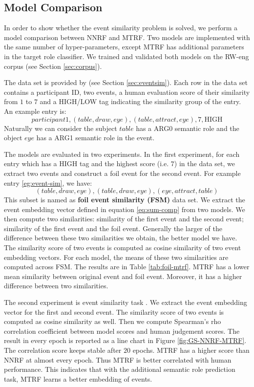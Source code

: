 \documentclass[a4paper]{article}
\begin{document}
\subsection{Model Comparison} \label{sec:comp_mtrf}
In order to show whether the event similarity problem is solved, we perform a model comparison between NNRF and MTRF. Two models are implemented with the same number of hyper-parameters, except MTRF has additional parameters in the target role classifier. We trained and validated both models on the RW-eng corpus (see Section \ref{sec:corpus}). 

The data set is provided by \citet{grefenstette2015concrete} (see Section \ref{sec:eventsim}). Each row in the data set contains a participant ID, two events, a human evaluation score of their similarity from $1$ to $7$ and a HIGH/LOW tag indicating the similarity group of the entry. An example entry is:
\begin{equation} \label{eg:event-sim}
    participant1, (table, draw, eye), (table, attract, eye), 7, \text{HIGH}
\end{equation}
Naturally we can consider the subject $table$ has a ARG0 semantic role and the object $eye$ has a ARG1 semantic role in the event.

The models are evaluated in two experiments. In the first experiment, for each entry which has a HIGH tag and the highest score (i.e. $7$) in the data set, we extract two events and construct a foil event for the second event. For example entry \eqref{eg:event-sim}, we have:
\begin{equation}
    (table, draw, eye), (table, draw, eye), (eye, attract, table)
\end{equation}
This subset is named as \textbf{foil event similarity (FSM)} data set. We extract the event embedding vector defined in equation  \eqref{eq:sum-comp} from two models. We then compute two similarities: similarity of the first event and the second event; similarity of the first event and the foil event. Generally the larger of the difference between these two similarities we obtain, the better model we have. The similarity score of two events is computed as cosine similarity of two event embedding vectors. For each model, the means of these two similarities are computed across FSM. The results are in Table \ref{tab:foil-mtrf}. MTRF has a lower mean similarity between original event and foil event. Moreover, it has a higher difference between two similarities. 

The second experiment is event similarity task \citep{grefenstette2015concrete}. We extract the event embedding vector for the first and second event. The similarity score of two events is computed as cosine similarity as well. Then we compute Spearman's rho correlation coefficient between model scores and human judgement scores. The result in every epoch is reported as a line chart in Figure \ref{fig:GS-NNRF-MTRF}. The correlation score keeps stable after $20$ epochs. MTRF has a higher score than NNRF at almost every epoch. Thus MTRF is better correlated with human performance. This indicates that with the additional semantic role prediction task, MTRF learns a better embedding of events. 
\end{document}
